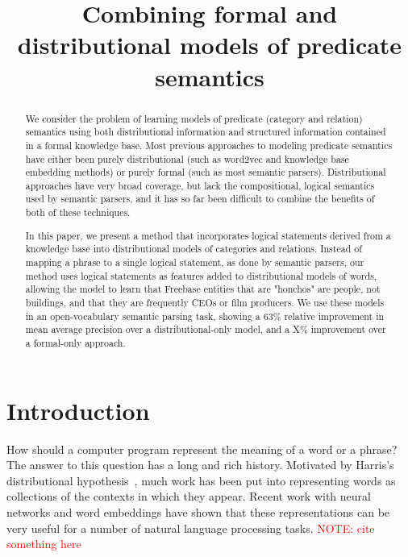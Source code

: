 \documentclass[11pt]{article}
\title{Combining formal and distributional models of predicate semantics}
\author{}%
\date{}
\newcommand{\mattnote}[1]{\textcolor{red}{NOTE: #1}}
\begin{document}
\maketitle

\begin{abstract}

  We consider the problem of learning models of predicate (category and
  relation) semantics using both distributional information and structured
  information contained in a formal knowledge base.  Most previous approaches
  to modeling predicate semantics have either been purely distributional (such
  as word2vec and knowledge base embedding methods) or purely formal (such as
  most semantic parsers).  Distributional approaches have very broad coverage,
  but lack the compositional, logical semantics used by semantic parsers, and
  it has so far been difficult to combine the benefits of both of these
  techniques.

  In this paper, we present a method that incorporates logical statements
  derived from a knowledge base into distributional models of categories and
  relations.  Instead of mapping a phrase to a single logical statement, as
  done by semantic parsers, our method uses logical statements as features
  added to distributional models of words, allowing the model to learn that
  Freebase entities that are "honchos" are people, not buildings, and that they
  are frequently CEOs or film producers.  We use these models in an
  open-vocabulary semantic parsing task, showing a 63\% relative improvement in
  mean average precision over a distributional-only model, and a X\%
  improvement over a formal-only approach.

\end{abstract}

\section{Introduction}

How should a computer program represent the meaning of a word or a phrase?  The
answer to this question has a long and rich history.  Motivated by
Harris's distributional
hypothesis~\cite{harris-1954-distributional-hypothesis}, much work has been put
into representing words as collections of the contexts in which they appear.
Recent work with neural networks and word embeddings have shown that these
representations can be very useful for a number of natural language processing
tasks. \mattnote{cite something here}
\end{document}
